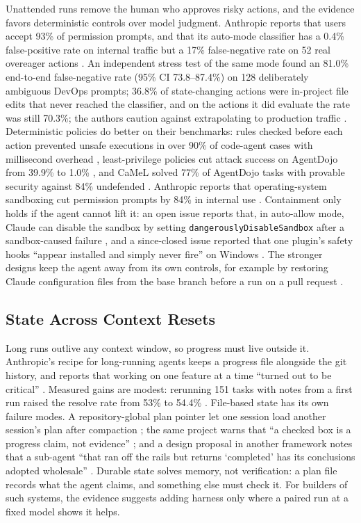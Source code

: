 Unattended runs remove the human who approves risky actions, and the evidence favors deterministic controls over model judgment. Anthropic reports that users accept 93\% of permission prompts, and that its auto-mode classifier has a 0.4\% false-positive rate on internal traffic but a 17\% false-negative rate on 52 real overeager actions \citep{H23}. An independent stress test of the same mode found an 81.0\% end-to-end false-negative rate (95\% CI 73.8--87.4\%) on 128 deliberately ambiguous DevOps prompts; 36.8\% of state-changing actions were in-project file edits that never reached the classifier, and on the actions it did evaluate the rate was still 70.3\%; the authors caution against extrapolating to production traffic \citep{H17}. Deterministic policies do better on their benchmarks: rules checked before each action prevented unsafe executions in over 90\% of code-agent cases with millisecond overhead \citep{H8}, least-privilege policies cut attack success on AgentDojo from 39.9\% to 1.0\% \citep{H9}, and CaMeL solved 77\% of AgentDojo tasks with provable security against 84\% undefended \citep{H18}. Anthropic reports that operating-system sandboxing cut permission prompts by 84\% in internal use \citep{H24}. Containment only holds if the agent cannot lift it: an open issue reports that, in auto-allow mode, Claude can disable the sandbox by setting \texttt{dangerouslyDisableSandbox} after a sandbox-caused failure , and a since-closed issue reported that one plugin's safety hooks ``appear installed and simply never fire'' on Windows . The stronger designs keep the agent away from its own controls, for example by restoring Claude configuration files from the base branch before a run on a pull request .

\subsection{State Across Context Resets}

Long runs outlive any context window, so progress must live outside it. Anthropic's recipe for long-running agents keeps a progress file alongside the git history, and reports that working on one feature at a time ``turned out to be critical'' \citep{H13}. Measured gains are modest: rerunning 151 tasks with notes from a first run raised the resolve rate from 53\% to 54.4\% \citep{H20}. File-based state has its own failure modes. A repository-global plan pointer let one session load another session's plan after compaction ; the same project warns that ``a checked box is a progress claim, not evidence'' ; and a design proposal in another framework notes that a sub-agent ``that ran off the rails but returns `completed' has its conclusions adopted wholesale'' . Durable state solves memory, not verification: a plan file records what the agent claims, and something else must check it. For builders of such systems, the evidence suggests adding harness only where a paired run at a fixed model shows it helps.
